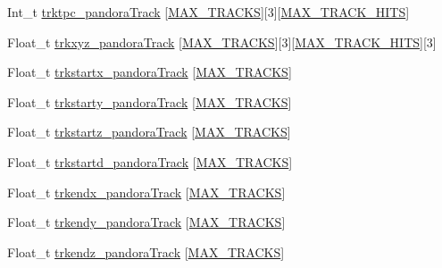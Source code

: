\begin{DoxyCompactItemize}
\item 
Int\-\_\-t \hyperlink{classanatree_a398371428049d52930f2545c31a9e15e}{trktpc\-\_\-pandora\-Track} \mbox{[}\hyperlink{anatree__core__v09410002_8h_a327fd4e796e4a0d78947524c96e4362e}{M\-A\-X\-\_\-\-T\-R\-A\-C\-K\-S}\mbox{]}\mbox{[}3\mbox{]}\mbox{[}\hyperlink{anatree__core__v09410002_8h_ae75eb9050f16aa034339f05572523070}{M\-A\-X\-\_\-\-T\-R\-A\-C\-K\-\_\-\-H\-I\-T\-S}\mbox{]}
\item 
Float\-\_\-t \hyperlink{classanatree_a62e9898ef8a4d6bc9929f5e8c058ad25}{trkxyz\-\_\-pandora\-Track} \mbox{[}\hyperlink{anatree__core__v09410002_8h_a327fd4e796e4a0d78947524c96e4362e}{M\-A\-X\-\_\-\-T\-R\-A\-C\-K\-S}\mbox{]}\mbox{[}3\mbox{]}\mbox{[}\hyperlink{anatree__core__v09410002_8h_ae75eb9050f16aa034339f05572523070}{M\-A\-X\-\_\-\-T\-R\-A\-C\-K\-\_\-\-H\-I\-T\-S}\mbox{]}\mbox{[}3\mbox{]}
\item 
Float\-\_\-t \hyperlink{classanatree_ab465442cb1d2f550e8f2b702b0a04000}{trkstartx\-\_\-pandora\-Track} \mbox{[}\hyperlink{anatree__core__v09410002_8h_a327fd4e796e4a0d78947524c96e4362e}{M\-A\-X\-\_\-\-T\-R\-A\-C\-K\-S}\mbox{]}
\item 
Float\-\_\-t \hyperlink{classanatree_af0abb36deb6c63c9faea5f7d68738d92}{trkstarty\-\_\-pandora\-Track} \mbox{[}\hyperlink{anatree__core__v09410002_8h_a327fd4e796e4a0d78947524c96e4362e}{M\-A\-X\-\_\-\-T\-R\-A\-C\-K\-S}\mbox{]}
\item 
Float\-\_\-t \hyperlink{classanatree_a9e39d6a03eec25296bebc762fba3725a}{trkstartz\-\_\-pandora\-Track} \mbox{[}\hyperlink{anatree__core__v09410002_8h_a327fd4e796e4a0d78947524c96e4362e}{M\-A\-X\-\_\-\-T\-R\-A\-C\-K\-S}\mbox{]}
\item 
Float\-\_\-t \hyperlink{classanatree_ab68e19c86f192013127b72bf110742fe}{trkstartd\-\_\-pandora\-Track} \mbox{[}\hyperlink{anatree__core__v09410002_8h_a327fd4e796e4a0d78947524c96e4362e}{M\-A\-X\-\_\-\-T\-R\-A\-C\-K\-S}\mbox{]}
\item 
Float\-\_\-t \hyperlink{classanatree_a7b98607750a75c31e93911fd2a6b7d93}{trkendx\-\_\-pandora\-Track} \mbox{[}\hyperlink{anatree__core__v09410002_8h_a327fd4e796e4a0d78947524c96e4362e}{M\-A\-X\-\_\-\-T\-R\-A\-C\-K\-S}\mbox{]}
\item 
Float\-\_\-t \hyperlink{classanatree_a8e86649f69570da1a7558c900d034f96}{trkendy\-\_\-pandora\-Track} \mbox{[}\hyperlink{anatree__core__v09410002_8h_a327fd4e796e4a0d78947524c96e4362e}{M\-A\-X\-\_\-\-T\-R\-A\-C\-K\-S}\mbox{]}
\item 
Float\-\_\-t \hyperlink{classanatree_ac496000d1ab5e9df726be9479b555267}{trkendz\-\_\-pandora\-Track} \mbox{[}\hyperlink{anatree__core__v09410002_8h_a327fd4e796e4a0d78947524c96e4362e}{M\-A\-X\-\_\-\-T\-R\-A\-C\-K\-S}\mbox{]}

\end{DoxyCompactItemize}
